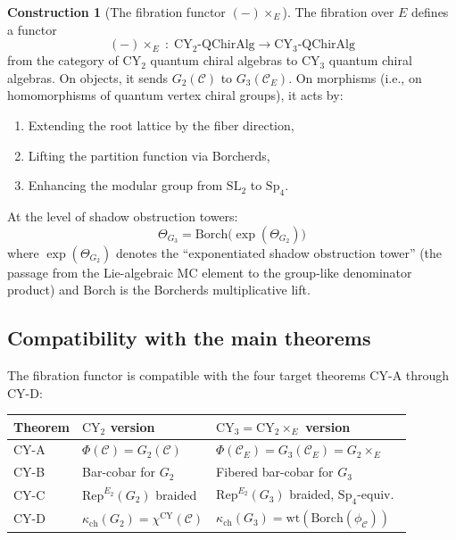 \documentclass[11pt]{article}
\theoremstyle{plain}
\theoremstyle{definition}
\newtheorem{construction}[theorem]{Construction}
\theoremstyle{remark}
\newcommand{\CY}{\mathrm{CY}}
\newcommand{\Rep}{\mathrm{Rep}}
\newcommand{\Etwo}{E_2}
\newcommand{\cC}{\mathcal{C}}
\begin{document}
\begin{construction}[The fibration functor $(-) \times_E$]
\label{constr:fibration-functor}
The fibration over $E$ defines a functor
\[
 (-) \times_E \;\colon\; \CY_2\text{-}\mathrm{QChirAlg}
 \longrightarrow \CY_3\text{-}\mathrm{QChirAlg}
\]
from the category of $\CY_2$ quantum chiral algebras to $\CY_3$ quantum chiral
algebras. On objects, it sends $G_2(\cC)$ to $G_3(\cC_E)$. On morphisms (i.e.,
on homomorphisms of quantum vertex chiral groups), it acts by:
\begin{enumerate}[label=(\roman*)]
\item Extending the root lattice by the fiber direction,
\item Lifting the partition function via Borcherds,
\item Enhancing the modular group from $\mathrm{SL}_2$ to $\mathrm{Sp}_4$.
\end{enumerate}

At the level of shadow obstruction towers:
\[
 \Theta_{G_3} = \mathrm{Borch}\bigl(\exp(\Theta_{G_2})\bigr)
\]
where $\exp(\Theta_{G_2})$ denotes the ``exponentiated shadow obstruction tower'' (the
passage from the Lie-algebraic MC element to the group-like denominator
product) and $\mathrm{Borch}$ is the Borcherds multiplicative lift.
\end{construction}

\subsection{Compatibility with the main theorems}
\label{subsec:compatibility-main}

The fibration functor is compatible with the four target theorems CY-A through
CY-D:

\begin{center}
\begin{tabular}{lll}
\textbf{Theorem} & \textbf{$\CY_2$ version} & \textbf{$\CY_3 = \CY_2 \times_E$ version} \\
\hline
CY-A & $\Phi(\cC) = G_2(\cC)$ & $\Phi(\cC_E) = G_3(\cC_E) = G_2 \times_E$ \\
CY-B & Bar-cobar for $G_2$ & Fibered bar-cobar for $G_3$ \\
CY-C & $\Rep^{\Etwo}(G_2)$ braided & $\Rep^{\Etwo}(G_3)$ braided, $\mathrm{Sp}_4$-equiv.\ \\
CY-D & $\kappa_{\mathrm{ch}}(G_2) = \chi^{\CY}(\cC)$ & $\kappa_{\mathrm{ch}}(G_3) = \mathrm{wt}(\mathrm{Borch}(\phi_\cC))$
\end{tabular}
\end{center}
\end{document}
